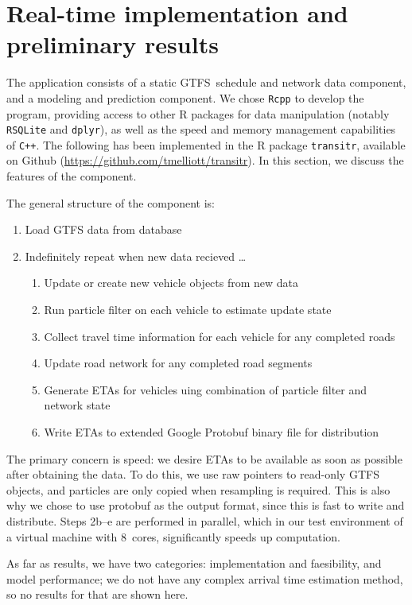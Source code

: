\section{Real-time implementation and preliminary results}
\label{sec:rt}

The application consists of a
static GTFS~schedule and network data component,
and a \rt modeling and prediction component.
We chose \verb+Rcpp+ to develop the program,
providing access to other R packages for data manipulation 
(notably \verb+RSQLite+ and \verb+dplyr+),
as well as the speed and memory management capabilities of \verb|C++|. 
The following has been implemented in the R package
\verb+transitr+, available on Github (\url{https://github.com/tmelliott/transitr}).
In this section, we discuss the features of the \rt component.

The general structure of the \rt component is:
\begin{enumerate}
\item Load GTFS data from database
\item Indefinitely repeat when new data recieved \ldots
\begin{enumerate}
    \item Update or create new vehicle objects from new data
    \item Run particle filter on each vehicle to estimate update state
    \item Collect travel time information for each vehicle for any completed roads
    \item Update road network for any completed road segments
    \item Generate ETAs for vehicles uing combination of particle filter and network state
    \item Write ETAs to extended Google Protobuf binary file for distribution
\end{enumerate}
\end{enumerate}

The primary concern is speed: 
we desire ETAs to be available as soon as possible after obtaining the data.
To do this, we use raw pointers to read-only GTFS objects,
and particles are only copied when resampling is required.
This is also why we chose to use protobuf as the output format,
since this is fast to write and distribute.
Steps 2b--e are performed in parallel, 
which in our test environment of a virtual machine with 8~cores, 
significantly speeds up computation.


As far as results, we have two categories:
implementation and faesibility,
and model performance;
we do not have any complex arrival time estimation method,
so no results for that are shown here.


